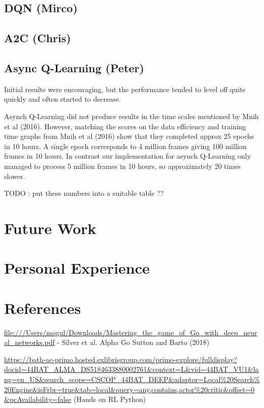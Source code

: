 \documentclass{article}
\begin{document}
\subsection{DQN (Mirco)}
\subsection{A2C (Chris)}
\subsection{Async Q-Learning (Peter)}

Initial results were encouraging, but the performance tended to level off quite quickly and often started to decrease.

Asynch Q-Learning did not produce results in the time scales mentioned by Mnih et al (2016).
However, matching the scores on the data efficiency and training time graphs from Mnih et al (2016) show that they completed approx 25 epochs in 10 hours.
A single epoch corresponds to 4 million frames giving 100 million frames in 10 hours.
In contrast our implementation for asynch Q-Learning only managed to process 5 million frames in 10 hours, so approximately 20 times slower.

TODO : put these numbers into a suitable table ??

\section{Future Work}


\section{Personal Experience}


\section*{References}


\url{file:///Users/mogul/Downloads/Mastering_the_game_of_Go_with_deep_neural_networks.pdf} - Silver et al. Alpha Go
Sutton and Barto (2018)

\url{https://bath-ac-primo.hosted.exlibrisgroup.com/primo-explore/fulldisplay?docid=44BAT_ALMA_DS5184633880002761&context=L&vid=44BAT_VU1&lang=en_US&search_scope=CSCOP_44BAT_DEEP&adaptor=Local%20Search%20Engine&isFrbr=true&tab=local&query=any,contains,actor%20critic&offset=0&pcAvailability=false} (Hands on RL Python)
\end{document}
